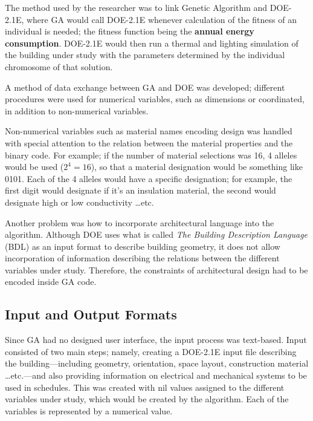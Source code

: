 The method used by the researcher was to link Genetic Algorithm and DOE-2.1E, where GA would call DOE-2.1E whenever calculation of the fitness of an individual is needed; the fitness function being the \textbf{annual energy consumption}. DOE-2.1E would then run a thermal and lighting simulation of the building under study with the parameters determined by the individual chromosome of that solution. 

A method of data exchange between GA and DOE was developed; different procedures were used for numerical variables, such as dimensions or coordinated, in addition to non-numerical variables.

Non-numerical variables such as material names encoding design was handled with special attention to the relation between the material properties and the binary code. For example; if the number of material selections was 16, 4 alleles would be used ($2^4=16$), so that a material designation would be something like 0101. Each of the 4 alleles would have a specific designation; for example, the first digit would designate if it's an insulation material, the second would designate high or low conductivity \ldots\hspace{0cm}etc.

Another problem was how to incorporate architectural language into the algorithm. Although DOE uses what is called \emph{The Building Description Language} (BDL) as an input format to describe building geometry, it does not allow incorporation of information describing the relations between the different variables under study. Therefore, the constraints of architectural design had to be encoded inside GA code.

\subsection{Input and Output Formats}

Since GA had no designed user interface, the input process was text-based. Input consisted of two main steps; namely, creating a DOE-2.1E input file describing the building---including geometry, orientation, space layout, construction material \ldots\hspace{0cm}etc.---and also providing information on electrical and mechanical systems to be used in schedules. This was created with nil values assigned to the different variables under study, which would be created by the algorithm. Each of the variables is represented by a numerical value.

